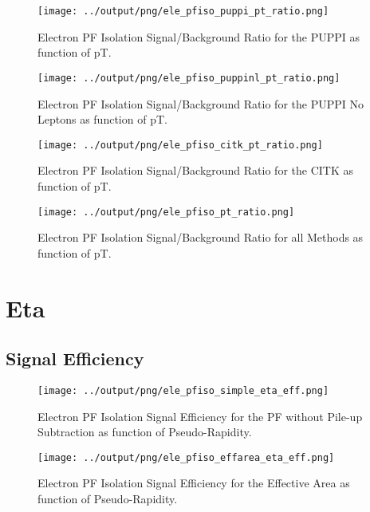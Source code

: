 \documentclass[11pt]{book}
\begin{document}
\begin{figure}[htb]
\centering
\texttt{[image: ../output/png/ele\_pfiso\_puppi\_pt\_ratio.png]}
\caption{Electron PF Isolation Signal/Background Ratio for the PUPPI as function of pT.}
\label{fig:ele_pfiso_pt_ratio_puppi}
\end{figure}

\begin{figure}[htb]
\centering
\texttt{[image: ../output/png/ele\_pfiso\_puppinl\_pt\_ratio.png]}
\caption{Electron PF Isolation Signal/Background Ratio for the PUPPI No Leptons as function of pT.}
\label{fig:ele_pfiso_pt_ratio_puppinl}
\end{figure}

\begin{figure}[htb]
\centering
\texttt{[image: ../output/png/ele\_pfiso\_citk\_pt\_ratio.png]}
\caption{Electron PF Isolation Signal/Background Ratio for the CITK as function of pT.}
\label{fig:ele_pfiso_pt_ratio_citk}
\end{figure}


\begin{figure}[htb]
\centering
\texttt{[image: ../output/png/ele\_pfiso\_pt\_ratio.png]}
\caption{Electron PF Isolation Signal/Background Ratio for all Methods as function of pT.}
\label{fig:ele_pfiso_pt_ratio}
\end{figure}
\clearpage


\section{Eta}

\subsection{Signal Efficiency}
\begin{figure}[htb]
\centering
\texttt{[image: ../output/png/ele\_pfiso\_simple\_eta\_eff.png]}
\caption{Electron PF Isolation Signal Efficiency for the PF without Pile-up Subtraction as function of Pseudo-Rapidity.}
\label{fig:ele_pfiso_eta_eff_simple}
\end{figure}

\begin{figure}[htb]
\centering
\texttt{[image: ../output/png/ele\_pfiso\_effarea\_eta\_eff.png]}
\caption{Electron PF Isolation Signal Efficiency for the Effective Area as function of Pseudo-Rapidity.}
\label{fig:ele_pfiso_eta_eff_effarea}
\end{figure}
\end{document}

